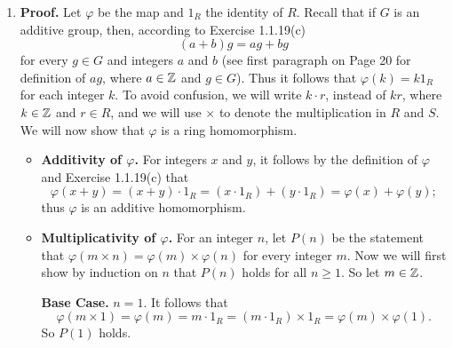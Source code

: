 \begin{enumerate}
      \begin{enumerate}
         \item \textbf{Proof.} Let $\varphi$ be the map and $1_R$ the identity
               of $R$. Recall that if $G$ is an additive group, then, according 
               to Exercise 1.1.19(c)
               $$(a + b)g = ag + bg$$
               for every $g \in G$ and integers $a$ and $b$ (see first paragraph
               on Page 20 for definition of $ag$, where $a \in \mathbb{Z}$ and
               $g \in G$). Thus it follows that $\varphi(k) = k1_R$ for each 
               integer $k$. To avoid confusion, we will write $k \cdot r$, 
               instead of $kr$, where $k \in \mathbb{Z}$ and $r \in R$, and we will use
               $\times$ to denote the multiplication in $R$ and $S$. We will now
               show that $\varphi$ is a ring homomorphism.
               \begin{itemize}
                  \item \textbf{Additivity of $\varphi$.} For integers $x$ and
                        $y$, it follows by the definition of $\varphi$ and 
                        Exercise 1.1.19(c) that
                        $$\varphi(x + y) = (x + y)\cdot1_R = (x\cdot1_R) +
                           (y\cdot1_R) = \varphi(x) + \varphi(y);$$
                        thus $\varphi$ is an additive homomorphism. 
                  \item \textbf{Multiplicativity of $\varphi$.} For an integer
                        $n$, let $P(n)$ be the statement that
                        $\varphi(m \times n) = \varphi(m)\times\varphi(n)$ for
                        every integer $m$. Now we will first show by induction 
                        on $n$ that $P(n)$ holds for all $n \ge 1$. So let
                        $m \in \mathbb{Z}$.
         
                        \textbf{Base Case.} $n = 1$. It follows that
                        $$\varphi(m \times 1) = \varphi(m) = m \cdot 1_R =
                          (m\cdot1_R) \times 1_R = \varphi(m)\times\varphi(1).$$
                        So $P(1)$ holds.
         

\end{itemize}
\end{enumerate}
\end{enumerate}
